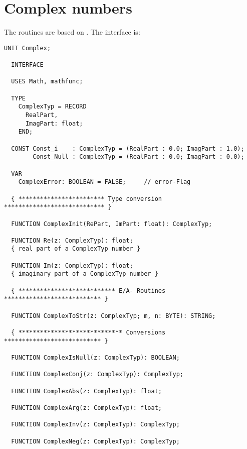 \chapter{Complex numbers}
\begin{refsection}


 The routines are based on \parencite{Gie-87,Thi-89}. The interface is:

\begin{lstlisting}[caption=Interface of \texttt{Complex}]
  UNIT Complex;

  INTERFACE

  USES Math, mathfunc;

  TYPE
    ComplexTyp = RECORD
      RealPart,
      ImagPart: float;
    END;

  CONST Const_i    : ComplexTyp = (RealPart : 0.0; ImagPart : 1.0);
        Const_Null : ComplexTyp = (RealPart : 0.0; ImagPart : 0.0);

  VAR
    ComplexError: BOOLEAN = FALSE;     // error-Flag

  { ************************ Type conversion **************************** }

  FUNCTION ComplexInit(RePart, ImPart: float): ComplexTyp;

  FUNCTION Re(z: ComplexTyp): float;
  { real part of a ComplexTyp number }

  FUNCTION Im(z: ComplexTyp): float;
  { imaginary part of a ComplexTyp number }

  { *************************** E/A- Routines *************************** }

  FUNCTION ComplexToStr(z: ComplexTyp; m, n: BYTE): STRING;

  { ***************************** Conversions *************************** }

  FUNCTION ComplexIsNull(z: ComplexTyp): BOOLEAN;

  FUNCTION ComplexConj(z: ComplexTyp): ComplexTyp;

  FUNCTION ComplexAbs(z: ComplexTyp): float;

  FUNCTION ComplexArg(z: ComplexTyp): float;

  FUNCTION ComplexInv(z: ComplexTyp): ComplexTyp;

  FUNCTION ComplexNeg(z: ComplexTyp): ComplexTyp;


\end{lstlisting}
\end{refsection}
